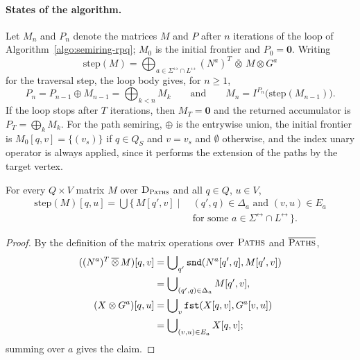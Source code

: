 \paragraph{States of the algorithm.}
Let $M_n$ and $P_n$ denote the matrices $M$ and $P$ after $n$ iterations of the loop of Algorithm~\ref{algo:semiring-rpq}; $M_0$ is the initial frontier and $P_0 = \mathbf{0}$.
Writing
\[
	\mathrm{step}(M) = \bigoplus_{a \in \Sigma^\leftrightarrow \cap L^\leftrightarrow} (N^a)^T \,\overline{\otimes}\, M \otimes G^a
\]
for the traversal step, the loop body gives, for $n \geq 1$,
\[
	P_n = P_{n-1} \oplus M_{n-1} = \bigoplus_{k < n} M_k
	\qquad\text{and}\qquad
	M_n = I^{P_n}\big(\mathrm{step}(M_{n-1})\big).
\]
If the loop stops after $T$ iterations, then $M_T = \mathbf{0}$ and the returned accumulator is $P_T = \bigoplus_k M_k$.
For the path semiring, $\oplus$ is the entrywise union, the initial frontier is $M_0[q, v] = \{ (v_s) \}$ if $q \in Q_S$ and $v = v_s$ and $\emptyset$ otherwise, and the index unary operator is always applied, since it performs the extension of the paths by the target vertex.

\begin{lemma}\label{lem:step}
	For every $Q \times V$ matrix $M$ over $\textsc{D}_{\textsc{Paths}}$ and all $q \in Q$, $u \in V$,
	\begin{align*}
		\mathrm{step}(M)[q, u] = \bigcup \{\, M[q', v] \mid \ & (q', q) \in \Delta_a \text{ and } (v, u) \in E_a \\
		                                                     & \text{for some } a \in \Sigma^\leftrightarrow \cap L^\leftrightarrow \,\}.
	\end{align*}
\end{lemma}
\begin{proof}
	By the definition of the matrix operations over $\textsc{Paths}$ and $\overline{\textsc{Paths}}$,
	\begin{align*}
		((N^a)^T \,\overline{\otimes}\, M)[q, v] &= \bigcup\nolimits_{q'} \texttt{snd}(N^a[q', q], M[q', v]) \\
		                                        &= \bigcup\nolimits_{(q', q) \in \Delta_a} M[q', v], \\
		(X \otimes G^a)[q, u] &= \bigcup\nolimits_{v} \texttt{fst}(X[q, v], G^a[v, u]) \\
		                      &= \bigcup\nolimits_{(v, u) \in E_a} X[q, v];
	\end{align*}
	summing over $a$ gives the claim.
\end{proof}

